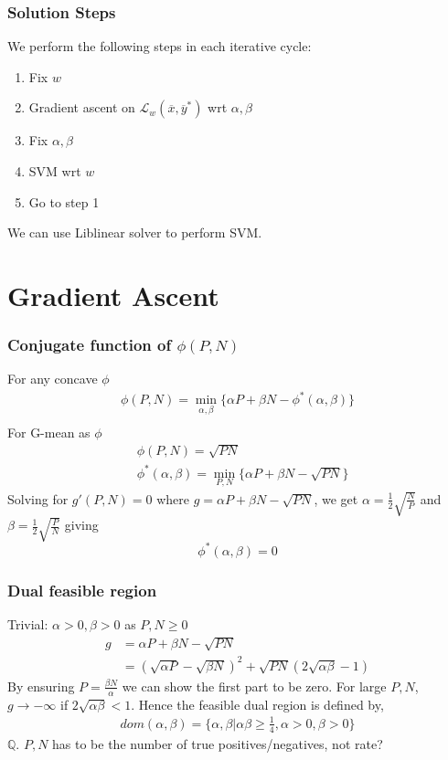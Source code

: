 \documentclass{beamer}
\begin{document}
\begin{frame}
	\frametitle{Solution Steps}
	We perform the following steps in each iterative cycle:
	\begin{enumerate}
	\item Fix $w$
	\item Gradient ascent on $\mathcal L_w(\overline{x},\overline{y}^*)$ wrt $\alpha,\beta$
	\item Fix $\alpha,\beta$
	\item SVM wrt $w$
	\item Go to step 1
	\end{enumerate}
	We can use Liblinear solver to perform SVM.
\end{frame}

\section{Gradient Ascent}
\begin{frame}
	\frametitle{Conjugate function of $\phi(P,N)$}
	For any concave $\phi$
	\begin{align*}
	\phi(P,N) = \min_{\alpha,\beta}\{\alpha P+\beta N-\phi^*(\alpha,\beta)\}\\
	\end{align*}
	For G-mean as $\phi$
	\begin{align*}
	&\phi(P,N)=\sqrt{PN}\\
	&\phi^*(\alpha,\beta) = \min_{P,N}\{\alpha P+\beta N-\sqrt{PN}\}
	\end{align*}	
	Solving for $g'(P,N)=0$ where $g=\alpha P+\beta N-\sqrt{PN}$, we get $\alpha=\frac{1}{2}\sqrt{\frac{N}{P}}$ and $\beta=\frac{1}{2}\sqrt{\frac{P}{N}}$ giving
	\begin{equation}
	\phi^*(\alpha,\beta)=0
	\end{equation}
\end{frame}
\begin{frame}
	\frametitle{Dual feasible region}
	Trivial: $\alpha > 0,\beta > 0$ as $P,N \geq 0$
	\begin{align*}
	g &= \alpha P+\beta N-\sqrt{PN}\\
	&=(\sqrt{\alpha P}-\sqrt{\beta N})^2+\sqrt{PN}(2\sqrt{\alpha\beta}-1)
	\end{align*}
	By ensuring $P=\frac{\beta N}{\alpha}$ we can show the first part to be zero. For large $P,N$, $g \to -\infty$  if $2\sqrt{\alpha\beta}<1$. Hence the feasible dual region is defined by,
	\begin{align*}
	dom(\alpha,\beta) = \{\alpha,\beta|\alpha\beta \geq \frac{1}{4},\alpha > 0,\beta > 0\}
	\end{align*}
	$\mathbb{Q}$. $P,N$ has to be the number of true positives/negatives, not rate?
\end{frame}
\end{document}
